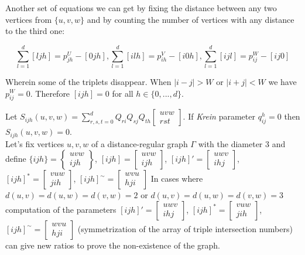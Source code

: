 \documentclass{article}
\theoremstyle{definition}
\theoremstyle{definition}
\theoremstyle{remark}
\begin{document}
Another set of equations we can get by fixing the distance between any two vertices from $\{u,v,w\}$ and by counting the number of vertices with any distance to the third one:


\[
    \sum_{l=1}^d [ljh] = p_{jh}^U - [0jh],
    \sum_{l=1}^d [ilh] = p_{ih}^V - [i0h],
    \sum_{l=1}^d [ijl] = p_{ij}^W - [ij0]
\label{eq:plus}
\tag{+}
\]

Wherein some of the triplets disappear. When $|i-j|>W$ or $|i+j|<W$ we have $p_{ij}^W = 0$. Therefore $[ijh]=0$ for all $h \in \{0, ..., d\}$.

Let $S_{ijh}(u,v,w) = \sum_{r,s,t=0}^d Q_{ri}Q_{sj}Q_{th} \begin{bmatrix}
    u v w \\
    r s t \end{bmatrix}$.
If {\it Krein } parameter $q_{ij}^h = 0$ then $S_{ijh}(u,v,w) = 0$.
\\

Let's fix vertices $u, v, w$ of a distance-regular graph $\Gamma$ with the diameter $3$ and define
$ \{ijh\} = \begin{Bmatrix} uvw \\ ijh \end{Bmatrix}$,
$ [ijh] = \begin{bmatrix} uvw \\ ijh \end{bmatrix}$,
$ [ijh]' = \begin{bmatrix} uwv \\ ihj \end{bmatrix}$,
$ [ijh]^* = \begin{bmatrix} vuw \\ jih \end{bmatrix}$,
$ [ijh]^{\sim} = \begin{bmatrix} wvu \\ hji \end{bmatrix}$
In cases where $d(u,v) = d(u,w) = d(v, w) = 2$ or $d(u,v) = d(u,w) = d(v, w) = 3$ computation of the parameters
$ [ijh]' = \begin{bmatrix} uwv \\ ihj \end{bmatrix}$,
$ [ijh]^* = \begin{bmatrix} vuw \\ jih \end{bmatrix}$,
$ [ijh]^{\sim} = \begin{bmatrix} wvu \\ hji \end{bmatrix}$
(symmetrization of the array of triple intersection numbers) can give new ratios to prove the non-existence of the graph.
\end{document}
